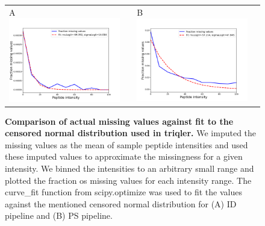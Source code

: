 \documentclass[11pt]{article}
\begin{document}
\begin{figure}[hbt]
    \centering
    \centering
    \begin{tabular}{lclc} 
        A \includegraphics[width=0.5\linewidth]{../../result/report_plots_pipeline/fraction_missing_values_ID.png} & &%
        B \includegraphics[width=0.5\linewidth]{../../result/report_plots_pipeline/fraction_missing_values_PS.png} & \\%
    \end{tabular}
    \caption{{\bf Comparison of actual missing values against fit to the censored normal distribution used in triqler.} We imputed the missing values as the mean of sample peptide intensities and used these imputed values to approximate the missingness for a given intensity. We binned the intensities to an arbitrary small range and plotted the fraction os missing values for each intensity range. The curve\_fit function from scipy.optimize was used to fit the values against the mentioned censored normal distribution for (A) ID pipeline  and (B) PS pipeline. \label{fig:fraction_missing_values}}
\end{figure}
\end{document}

